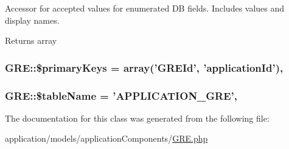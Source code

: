 Accessor for accepted values for enumerated D\-B fields. Includes values and display names.

\begin{DoxyReturn}{Returns}
array 
\end{DoxyReturn}
\hypertarget{class_g_r_e_a369e53315376c52b3f99114ff4476f7d}{
\subsubsection[{\$primary\-Keys}]{\setlength{\rightskip}{0pt plus 5cm}G\-R\-E\-::\$primary\-Keys = array('G\-R\-E\-Id', 'application\-Id')\hspace{0.3cm}{\ttfamily [static]}, {\ttfamily [protected]}}}\label{class_g_r_e_a369e53315376c52b3f99114ff4476f7d}
\hypertarget{class_g_r_e_afd710fa5f2d6c8827c1c8d6ff40aa06c}{
\subsubsection[{\$table\-Name}]{\setlength{\rightskip}{0pt plus 5cm}G\-R\-E\-::\$table\-Name = 'A\-P\-P\-L\-I\-C\-A\-T\-I\-O\-N\-\_\-\-G\-R\-E'\hspace{0.3cm}{\ttfamily [static]}, {\ttfamily [protected]}}}\label{class_g_r_e_afd710fa5f2d6c8827c1c8d6ff40aa06c}


The documentation for this class was generated from the following file\-:\begin{DoxyCompactItemize}
\item 
application/models/application\-Components/\hyperlink{_g_r_e_8php}{G\-R\-E.\-php}\end{DoxyCompactItemize}
